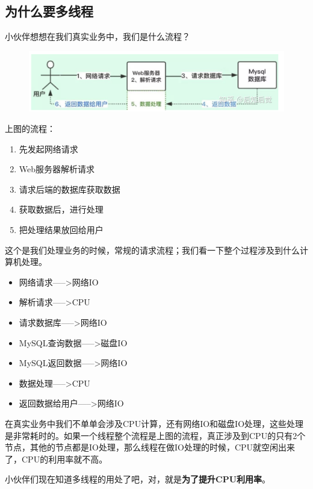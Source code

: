 \documentclass[12pt]{article}
\begin{document}
\subsection{为什么要多线程}
小伙伴想想在我们真实业务中，我们是什么流程？
\begin{figure}[H]
    \centering
    \includegraphics[width=1\textwidth]{fig/Multi_Thread_How_Many_1.png}
\end{figure}

上图的流程：
\begin{enumerate}
\setlength{\itemsep}{0pt}
\setlength{\parsep}{0pt}
\setlength{\parskip}{0pt}
    \item 先发起网络请求
    \item Web服务器解析请求
    \item 请求后端的数据库获取数据
    \item 获取数据后，进行处理
    \item 把处理结果放回给用户
\end{enumerate}

这个是我们处理业务的时候，常规的请求流程；我们看一下整个过程涉及到什么计算机处理。
\begin{itemize}
\setlength{\itemsep}{0pt}
\setlength{\parsep}{0pt}
\setlength{\parskip}{0pt}
    \item 网络请求----->网络IO
    \item 解析请求----->CPU
    \item 请求数据库----->网络IO
    \item MySQL查询数据----->磁盘IO
    \item MySQL返回数据----->网络IO
    \item 数据处理----->CPU
    \item 返回数据给用户----->网络IO
\end{itemize}

在真实业务中我们不单单会涉及CPU计算，还有网络IO和磁盘IO处理，这些处理是非常耗时的。如果一个线程整个流程是上图的流程，真正涉及到CPU的只有2个节点，其他的节点都是IO处理，那么线程在做IO处理的时候，CPU就空闲出来了，CPU的利用率就不高。

小伙伴们现在知道多线程的用处了吧，对，就是\textbf{为了提升CPU利用率}。
\end{document}
